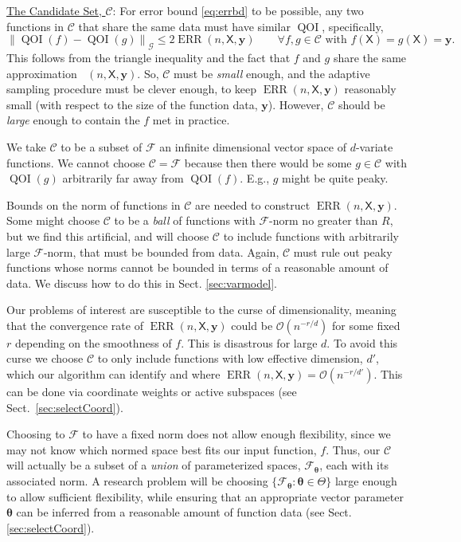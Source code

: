 \documentclass[11pt]{NSFamsart}
\newcommand{\Upara}[1]{\noindent\underline{\upshape #1}:}
\DeclareMathOperator{\QOI}{QOI} %
\DeclareMathOperator{\APP}{\widehat{\QOI}}
\DeclareMathOperator{\ERR}{ERR}
\newcommand{\mX}{\mathsf{X}}
\newcommand{\by}{{\boldsymbol{y}}}
\newcommand{\btheta}{{\boldsymbol{\theta}}}
\newcommand{\calc}{{\mathcal{C}}}
\newcommand{\calf}{{\mathcal{F}}}
\newcommand{\calg}{{\mathcal{G}}}
\newcommand{\bignorm}[2][{}]{\ensuremath{\bigl \lVert #2 \bigr \rVert}_{#1}}
\newcommand{\Order}{\mathcal{O}}
\begin{document}
\Upara{The Candidate Set, $\calc$} 
For error bound \eqref{eq:errbd}  to be possible, any two functions in $\calc$ that share the same data must have similar $\QOI$, specifically, 
\begin{equation} \label{eq:Csmall}
	\bignorm[\calg]{\QOI(f) - \QOI(g)} \le 2 \ERR(n,\mX,\by) \qquad \forall f, g \in \calc \text{ with } f(\mX) = g(\mX) = \by.
\end{equation}
This follows from the triangle inequality and the fact that $f$ and $g$ share the same approximation $\APP(n,\mX,\by)$. So, $\calc$ must be \emph{small} enough, and the adaptive sampling procedure must be clever enough, to keep $\ERR(n,\mX,\by)$ reasonably small (with respect to the size of the function data, $\by$).  However, $\calc$ should be \emph{large} enough to contain the $f$ met in practice.

We take $\calc$ to be a subset of $\calf$ an infinite dimensional vector space of $d$-variate functions. We cannot choose $\calc = \calf$ because then there would be some $g \in \calc$ with $\QOI(g)$ arbitrarily far away from $\QOI(f)$.  E.g., $g$ might be quite peaky.

Bounds on the norm of functions in  $\calc$ are needed to construct $\ERR(n,\mX,\by)$.  Some might choose $\calc$ to be a \emph{ball} of functions with $\calf$-norm no greater than $R$, but we find this artificial, and will choose $\calc$ to include functions with arbitrarily large $\calf$-norm, that must be bounded from data.  Again, $\calc$ must rule out peaky functions whose norms cannot be bounded in terms of a reasonable amount of data.  We discuss how to do this in Sect. \ref{sec:varmodel}.

Our problems of interest are susceptible to the curse of dimensionality, meaning that the convergence rate of $\ERR(n,\mX,\by)$ could be $\Order(n^{-r/d})$ for some fixed $r$ depending on the smoothness of $f$.  This  is disastrous for large $d$.  To avoid this curse we choose $\calc$ to only include functions with low effective dimension, $d'$, which our algorithm can identify and where $\ERR(n,\mX,\by) = \Order(n^{-r/d'})$.  This can be done via coordinate weights or active subspaces (see Sect.\ \ref{sec:selectCoord}). 

Choosing  to $\calf$ to have a fixed norm does not allow enough flexibility, since we may not know which normed space best fits our input function, $f$.  Thus, our $\calc$ will actually be a subset of  a \emph{union} of parameterized spaces, $\calf_\btheta$, each with its associated norm.  A research problem will be choosing $\{\calf_\btheta : \btheta \in \Theta\}$ large enough to allow sufficient flexibility, while ensuring that an appropriate vector parameter $\btheta$ can be inferred from a reasonable amount of function data (see Sect. \ref{sec:selectCoord}).
\end{document}
